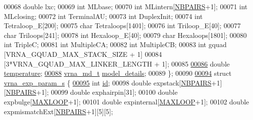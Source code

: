 \begin{DoxyCode}
00068   \textcolor{keywordtype}{double}  lxc;
00069   \textcolor{keywordtype}{int}     MLbase;
00070   \textcolor{keywordtype}{int}     MLintern[\hyperlink{energy__const_8h_a5e75221c779d618eab81e096f37e32ce}{NBPAIRS}+1];
00071   \textcolor{keywordtype}{int}     MLclosing;
00072   \textcolor{keywordtype}{int}     TerminalAU;
00073   \textcolor{keywordtype}{int}     DuplexInit;
00074   \textcolor{keywordtype}{int}     Tetraloop\_E[200];
00075   \textcolor{keywordtype}{char}    Tetraloops[1401];
00076   \textcolor{keywordtype}{int}     Triloop\_E[40];
00077   \textcolor{keywordtype}{char}    Triloops[241];
00078   \textcolor{keywordtype}{int}     Hexaloop\_E[40];
00079   \textcolor{keywordtype}{char}    Hexaloops[1801];
00080   \textcolor{keywordtype}{int}     TripleC;
00081   \textcolor{keywordtype}{int}     MultipleCA;
00082   \textcolor{keywordtype}{int}     MultipleCB;
00083   \textcolor{keywordtype}{int}     gquad [VRNA\_GQUAD\_MAX\_STACK\_SIZE + 1]
00084                 [3*VRNA\_GQUAD\_MAX\_LINKER\_LENGTH + 1];
00085 
\hypertarget{params_8h_source.tex_l00086}{}\hyperlink{group__energy__parameters_aeed2cd83713012bcb52e431041e037c8}{00086}   \textcolor{keywordtype}{double}  \hyperlink{group__energy__parameters_aeed2cd83713012bcb52e431041e037c8}{temperature};            
\hypertarget{params_8h_source.tex_l00088}{}\hyperlink{group__energy__parameters_a7b84353eb9075c595bad4ceb871bcae7}{00088}   \hyperlink{group__model__details_structvrna__md__s}{vrna\_md\_t} \hyperlink{group__energy__parameters_a7b84353eb9075c595bad4ceb871bcae7}{model\_details};   
00089 \};
00090 
\hypertarget{params_8h_source.tex_l00094}{}\hyperlink{group__energy__parameters}{00094} \textcolor{keyword}{struct }\hyperlink{group__energy__parameters_structvrna__exp__param__s}{vrna\_exp\_param\_s} \{
\hypertarget{params_8h_source.tex_l00095}{}\hyperlink{group__energy__parameters_a378d5bcf2bae1f3ec84c912c7d3908d2}{00095}   \textcolor{keywordtype}{int}     \hyperlink{group__energy__parameters_a378d5bcf2bae1f3ec84c912c7d3908d2}{id};   
00098   \textcolor{keywordtype}{double}  expstack[\hyperlink{energy__const_8h_a5e75221c779d618eab81e096f37e32ce}{NBPAIRS}+1][\hyperlink{energy__const_8h_a5e75221c779d618eab81e096f37e32ce}{NBPAIRS}+1];
00099   \textcolor{keywordtype}{double}  exphairpin[31];
00100   \textcolor{keywordtype}{double}  expbulge[\hyperlink{energy__const_8h_ad1bd6eabac419670ddd3c9ed82145988}{MAXLOOP}+1];
00101   \textcolor{keywordtype}{double}  expinternal[\hyperlink{energy__const_8h_ad1bd6eabac419670ddd3c9ed82145988}{MAXLOOP}+1];
00102   \textcolor{keywordtype}{double}  expmismatchExt[\hyperlink{energy__const_8h_a5e75221c779d618eab81e096f37e32ce}{NBPAIRS}+1][5][5];

\end{DoxyCode}
